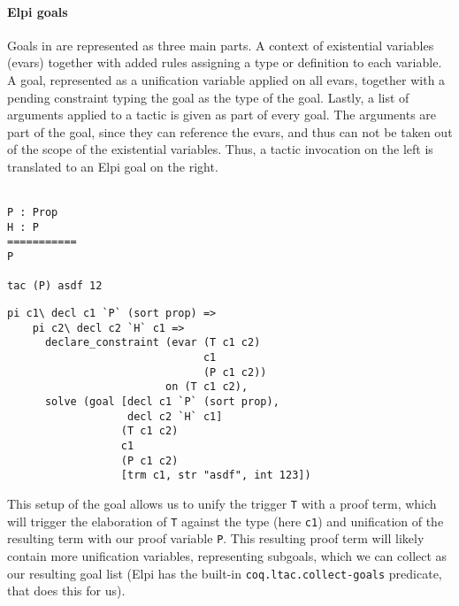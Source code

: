 \documentclass[thesis.tex]{subfiles}
\begin{document}
\paragraph*{Elpi goals}
Goals in \ce are represented as three main parts. A context of existential variables (evars) together with added rules assigning a type or definition to each variable. A goal, represented as a unification variable applied on all evars, together with a pending constraint typing the goal as the type of the goal. Lastly, a list of arguments applied to a tactic is given as part of every goal. The arguments are part of the goal, since they can reference the evars, and thus can not be taken out of the scope of the existential variables. Thus, a tactic invocation on the left is translated to an Elpi goal on the right.
\\\\
\begin{minipage}[t]{0.2\linewidth}
  \begin{verbatim}
P : Prop
H : P
===========
P

tac (P) asdf 12
\end{verbatim}
\end{minipage}
\begin{minipage}[t]{0.45\linewidth}
  \begin{verbatim}
pi c1\ decl c1 `P` (sort prop) =>
    pi c2\ decl c2 `H` c1 =>
      declare_constraint (evar (T c1 c2) 
                               c1
                               (P c1 c2)) 
                         on (T c1 c2),
      solve (goal [decl c1 `P` (sort prop), 
                   decl c2 `H` c1] 
                  (T c1 c2)
                  c1 
                  (P c1 c2)
                  [trm c1, str "asdf", int 123])
\end{verbatim}
  \vspace{.1cm}
\end{minipage}

This setup of the goal allows us to unify the trigger \texttt{T} with a proof term, which will trigger the elaboration of \texttt{T} against the type (here \texttt{c1}) and unification of the resulting term with our proof variable \texttt{P}. This resulting proof term will likely contain more unification variables, representing subgoals, which we can collect as our resulting goal list (Elpi has the built-in \texttt{coq.ltac.collect-goals} predicate, that does this for us).
\end{document}
